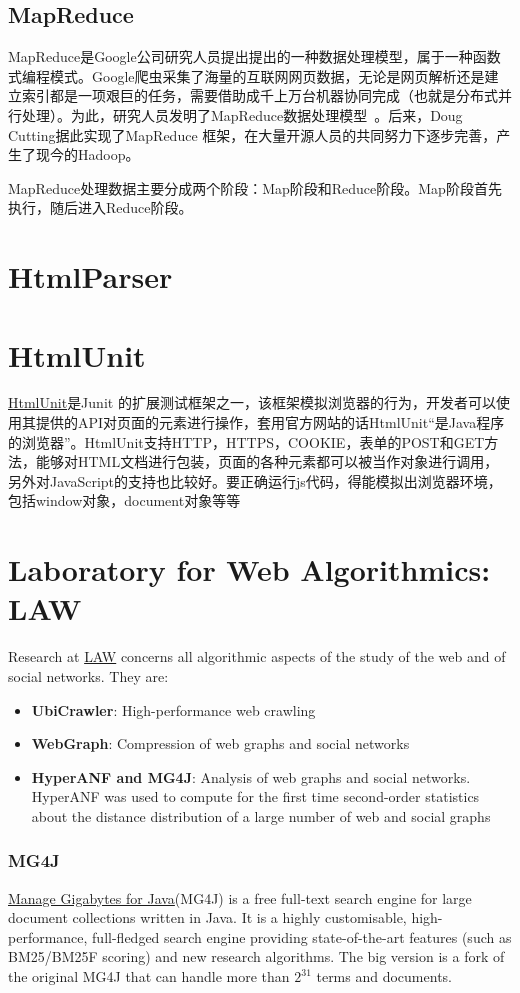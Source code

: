 \subsection{MapReduce}
MapReduce是Google公司研究人员提出提出的一种数据处理模型，属于一种函数式编程模式。Google爬虫采集了海量的互联网网页数据，无论是网页解析还是建立索引都是一项艰巨的任务，需要借助成千上万台机器协同完成（也就是分布式并行处理）。为此，研究人员发明了MapReduce数据处理模型~\cite{dean2008mapreduce}。后来，Doug Cutting据此实现了MapReduce 框架，在大量开源人员的共同努力下逐步完善，产生了现今的Hadoop。

MapReduce处理数据主要分成两个阶段：Map阶段和Reduce阶段。Map阶段首先执行，随后进入Reduce阶段。

\section{HtmlParser}

\section{HtmlUnit}
\href{http://sourceforge.net/projects/htmlunit/}{HtmlUnit}是Junit 的扩展测试框架之一，该框架模拟浏览器的行为，开发者可以使用其提供的API对页面的元素进行操作，套用官方网站的话HtmlUnit“是Java程序的浏览器”。HtmlUnit支持HTTP，HTTPS，COOKIE，表单的POST和GET方法，能够对HTML文档进行包装，页面的各种元素都可以被当作对象进行调用，另外对JavaScript的支持也比较好。要正确运行js代码，得能模拟出浏览器环境，包括window对象，document对象等等

\section{Laboratory for Web Algorithmics: LAW}
Research at \href{http://law.di.unimi.it/}{LAW} concerns all algorithmic aspects of the study of the web and of social networks. They are:
\begin{itemize}
\item \textbf{UbiCrawler}: High-performance web crawling
\item \textbf{WebGraph}: Compression of web graphs and social networks
\item \textbf{HyperANF and MG4J}: Analysis of web graphs and social networks. HyperANF was used to compute for the first time second-order statistics about the distance distribution of a large number of web and social graphs
\end{itemize}

\subsubsection{MG4J}
\href{http://mg4j.dsi.unimi.it/}{Manage Gigabytes for Java}(MG4J) is a free full-text search engine for large document collections written in Java. It is a highly customisable, high-performance, full-fledged search engine providing state-of-the-art features (such as BM25/BM25F scoring) and new research algorithms. The big version is a fork of the original MG4J that can handle more than $2^{31}$ terms and documents.

